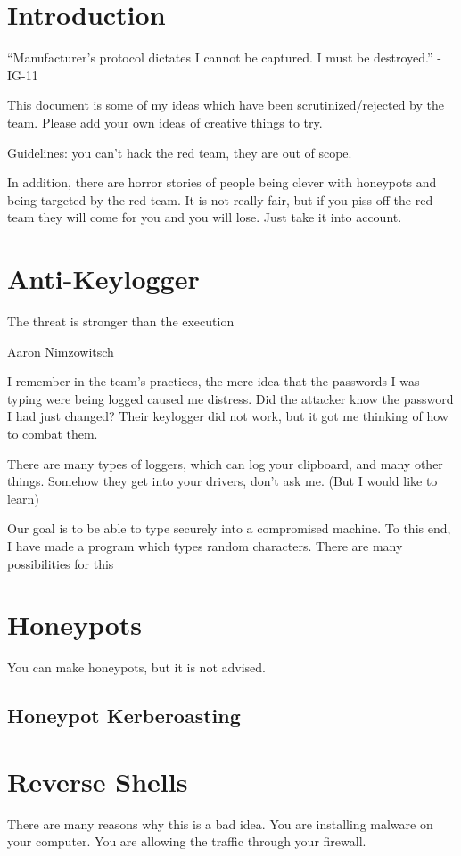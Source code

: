 \documentclass{article}
\begin{document}
\graphicspath{ {./Images/} }
\tableofcontents

\section{Introduction}
“Manufacturer's protocol dictates I cannot be captured. I must be destroyed.” - IG-11

This document is some of my ideas which have been scrutinized/rejected by the team. 
Please add your own ideas of creative things to try.

Guidelines: you can't hack the red team, they are out of scope.

In addition, there are horror stories of people being clever with honeypots and being targeted by the red team.
It is not really fair, but if you piss off the red team they will come for you and you will lose. Just take it into account.

\section{Anti-Keylogger}
\epigraph{The threat is stronger than the execution}{Aaron Nimzowitsch}

I remember in the team's practices, the mere idea that the passwords I was typing were being logged caused me distress. 
Did the attacker know the password I had just changed? Their keylogger did not work, but it got me thinking of how to combat them.

There are many types of loggers, which can log your clipboard, and many other things. Somehow they get into your drivers, don't ask me. (But I would like to learn)

Our goal is to be able to type securely into a compromised machine. To this end, I have made a program which types random characters. There are many possibilities for this

\section{Honeypots}
You can make honeypots, but it is not advised.

\subsection{Honeypot Kerberoasting}

\section{Reverse Shells}
There are many reasons why this is a bad idea. You are installing malware on your computer. 
You are allowing the traffic through your firewall.
\end{document}
